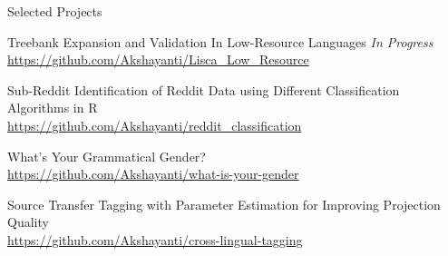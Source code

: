 \documentclass{resume}
\begin{document}

\begin{rSection}{Selected Projects}

    {Treebank Expansion and Validation In Low-Resource Languages \hfill \textit{In Progress}}\\
        \url{https://github.com/Akshayanti/Lisca_Low_Resource}

    {Sub-Reddit Identification of Reddit Data using Different Classification Algorithms in R}\\
        \url{https://github.com/Akshayanti/reddit_classification}

    {What's Your Grammatical Gender?}\\
        \url{https://github.com/Akshayanti/what-is-your-gender}

    {Source Transfer Tagging with Parameter Estimation for Improving Projection Quality}\\
        \url{https://github.com/Akshayanti/cross-lingual-tagging}

\end{rSection}


\end{document}
